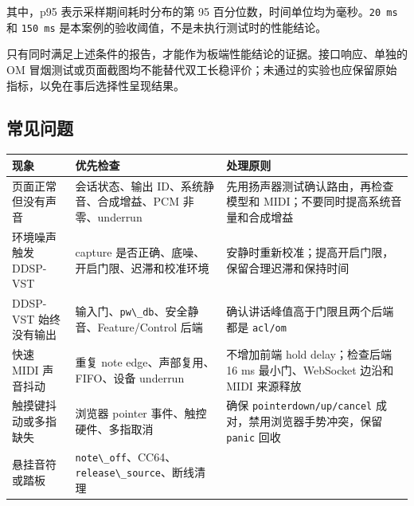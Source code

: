 其中，p95 表示采样期间耗时分布的第 95
百分位数，时间单位均为毫秒。\passthrough{\lstinline!20 ms!} 和
\passthrough{\lstinline!150 ms!}
是本案例的验收阈值，不是未执行测试时的性能结论。

只有同时满足上述条件的报告，才能作为板端性能结论的证据。接口响应、单独的
OM
冒烟测试或页面截图均不能替代双工长稳评价；未通过的实验也应保留原始指标，以免在事后选择性呈现结果。

\subsection{常见问题}\label{src-experiment-case3-troubleshooting}

\begin{longtable}[]{@{}
  >{\raggedright\arraybackslash}p{}
  >{\raggedright\arraybackslash}p{}
  >{\raggedright\arraybackslash}p{}@{}}
\toprule\noalign{}
\begin{minipage}[b]{\linewidth}\raggedright
现象
\end{minipage} & \begin{minipage}[b]{\linewidth}\raggedright
优先检查
\end{minipage} & \begin{minipage}[b]{\linewidth}\raggedright
处理原则
\end{minipage} \\
\midrule\noalign{}
\endhead
\bottomrule\noalign{}
\endlastfoot
页面正常但没有声音 & 会话状态、输出 ID、系统静音、合成增益、PCM
非零、underrun & 先用扬声器测试确认路由，再检查模型和
MIDI；不要同时提高系统音量和合成增益 \\
环境噪声触发 DDSP-VST & capture 是否正确、底噪、开启门限、迟滞和校准环境
& 安静时重新校准；提高开启门限，保留合理迟滞和保持时间 \\
DDSP-VST 始终没有输出 &
输入门、\passthrough{\lstinline!pw\_db!}、安全静音、Feature/Control 后端
& 确认讲话峰值高于门限且两个后端都是 \passthrough{\lstinline!acl/om!} \\
快速 MIDI 声音抖动 & 重复 note edge、声部复用、FIFO、设备 underrun &
不增加前端 hold delay；检查后端 16 ms 最小门、WebSocket 边沿和 MIDI
来源释放 \\
触摸键抖动或多指缺失 & 浏览器 pointer 事件、触控硬件、多指取消 & 确保
\passthrough{\lstinline!pointerdown/up/cancel!}
成对，禁用浏览器手势冲突，保留 \passthrough{\lstinline!panic!} 回收 \\
悬挂音符或踏板 &
\passthrough{\lstinline!note\_off!}、CC64、\passthrough{\lstinline!release\_source!}、断线清理

\end{longtable}
